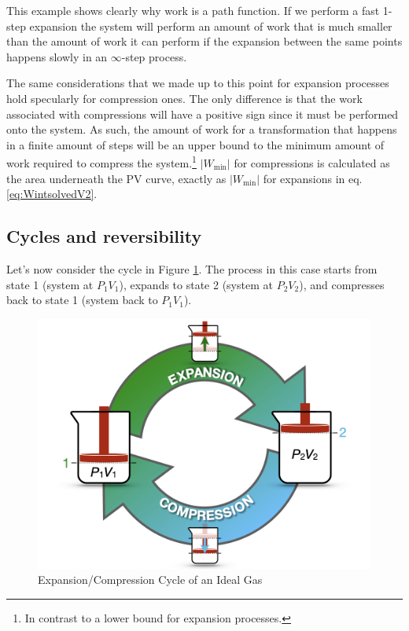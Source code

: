 \documentclass[
]{book}
\theoremstyle{definition}
\theoremstyle{definition}
\theoremstyle{definition}
\theoremstyle{remark}
\begin{document}
This example shows clearly why work is a path function. If we perform a fast 1-step expansion the system will perform an amount of work that is much smaller than the amount of work it can perform if the expansion between the same points happens slowly in an \(\infty\)-step process.

The same considerations that we made up to this point for expansion processes hold specularly for compression ones. The only difference is that the work associated with compressions will have a positive sign since it must be performed onto the system. As such, the amount of work for a transformation that happens in a finite amount of steps will be an upper bound to the minimum amount of work required to compress the system.\footnote{In contrast to a lower bound for expansion processes.} \(\left| W_{\text{min}} \right|\) for compressions is calculated as the area underneath the PV curve, exactly as \(\left| W_{\text{min}} \right|\) for expansions in eq. \eqref{eq:WintsolvedV2}.

\hypertarget{cycles-and-reversibility}{%
\subsection{Cycles and reversibility}\label{cycles-and-reversibility}}

Let's now consider the cycle in Figure \ref{fig:FigRevCyc}. The process in this case starts from state 1 (system at \(P_1V_1\)), expands to state 2 (system at \(P_2V_2\)), and compresses back to state 1 (system back to \(P_1V_1\)).

\begin{figure}

{\centering \includegraphics[width=0.8\linewidth]{./img/OEP_Figures.005} 

}

\caption{Expansion/Compression Cycle of an Ideal Gas}\label{fig:FigRevCyc}
\end{figure}
\end{document}
